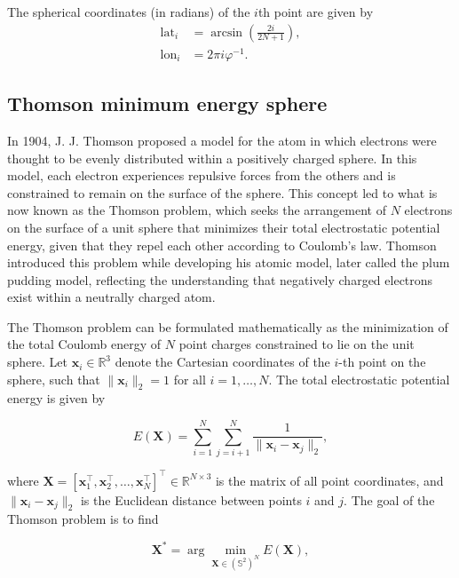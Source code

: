 The spherical coordinates (in radians) of the $i$th point are given by
\begin{align}
\text{lat}_i &= \arcsin\!\left(\frac{2i}{2N + 1}\right), \\
\text{lon}_i &= 2\pi i \varphi^{-1} .
\label{eq.2:fibonacci_lat_lon}
\end{align}

\subsection{Thomson minimum energy sphere} \label{sec.3:Thomson minimum energy sphere}

In 1904, J. J. Thomson proposed a model for the atom in which electrons were thought to be evenly distributed within a positively charged sphere. In this model, each electron experiences repulsive forces from the others and is constrained to remain on the surface of the sphere. This concept led to what is now known as the Thomson problem, which seeks the arrangement of $N$ electrons on the surface of a unit sphere that minimizes their total electrostatic potential energy, given that they repel each other according to Coulomb's law. Thomson introduced this problem while developing his atomic model, later called the plum pudding model, reflecting the understanding that negatively charged electrons exist within a neutrally charged atom.\cite{thomson_min_energy_sphere}

The Thomson problem can be formulated mathematically as the minimization of the total Coulomb energy of $N$ point charges constrained to lie on the unit sphere. Let $\mathbf{x}_i \in \mathbb{R}^3$ denote the Cartesian coordinates of the $i$-th point on the sphere, such that $\|\mathbf{x}_i\|_2 = 1$ for all $i = 1, \dots, N$. The total electrostatic potential energy is given by

\begin{equation}
E(\mathbf{X}) = \sum_{i=1}^{N} \sum_{j=i+1}^{N} \frac{1}{\|\mathbf{x}_i - \mathbf{x}_j\|_2},
\end{equation}

where $\mathbf{X} = [\mathbf{x}_1^\top, \mathbf{x}_2^\top, \dots, \mathbf{x}_N^\top]^\top \in \mathbb{R}^{N \times 3}$ is the matrix of all point coordinates, and $\|\mathbf{x}_i - \mathbf{x}_j\|_2$ is the Euclidean distance between points $i$ and $j$. The goal of the Thomson problem is to find

\begin{equation}
\mathbf{X}^* = \arg \min_{\mathbf{X} \in (\mathbb{S}^2)^N} E(\mathbf{X}),
\end{equation}

